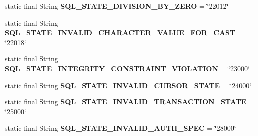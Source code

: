 \begin{DoxyCompactItemize}
\item 
\mbox{\label{classcom_1_1mysql_1_1jdbc_1_1_s_q_l_error_aa494ace8955c365c21a0f6cbff092982}} 
static final String {\bfseries S\+Q\+L\+\_\+\+S\+T\+A\+T\+E\+\_\+\+D\+I\+V\+I\+S\+I\+O\+N\+\_\+\+B\+Y\+\_\+\+Z\+E\+RO} = \char`\"{}22012\char`\"{}
\item 
\mbox{\label{classcom_1_1mysql_1_1jdbc_1_1_s_q_l_error_afa4c34094affa8f76839511bc8572d48}} 
static final String {\bfseries S\+Q\+L\+\_\+\+S\+T\+A\+T\+E\+\_\+\+I\+N\+V\+A\+L\+I\+D\+\_\+\+C\+H\+A\+R\+A\+C\+T\+E\+R\+\_\+\+V\+A\+L\+U\+E\+\_\+\+F\+O\+R\+\_\+\+C\+A\+ST} = \char`\"{}22018\char`\"{}
\item 
\mbox{\label{classcom_1_1mysql_1_1jdbc_1_1_s_q_l_error_ad5769eafd4af57a91115f3b7d6d98fbe}} 
static final String {\bfseries S\+Q\+L\+\_\+\+S\+T\+A\+T\+E\+\_\+\+I\+N\+T\+E\+G\+R\+I\+T\+Y\+\_\+\+C\+O\+N\+S\+T\+R\+A\+I\+N\+T\+\_\+\+V\+I\+O\+L\+A\+T\+I\+ON} = \char`\"{}23000\char`\"{}
\item 
\mbox{\label{classcom_1_1mysql_1_1jdbc_1_1_s_q_l_error_a94ab5e8ebca27c176a83d12876965fe8}} 
static final String {\bfseries S\+Q\+L\+\_\+\+S\+T\+A\+T\+E\+\_\+\+I\+N\+V\+A\+L\+I\+D\+\_\+\+C\+U\+R\+S\+O\+R\+\_\+\+S\+T\+A\+TE} = \char`\"{}24000\char`\"{}
\item 
\mbox{\label{classcom_1_1mysql_1_1jdbc_1_1_s_q_l_error_a172c17de0cb3218beb42b90e33467ccd}} 
static final String {\bfseries S\+Q\+L\+\_\+\+S\+T\+A\+T\+E\+\_\+\+I\+N\+V\+A\+L\+I\+D\+\_\+\+T\+R\+A\+N\+S\+A\+C\+T\+I\+O\+N\+\_\+\+S\+T\+A\+TE} = \char`\"{}25000\char`\"{}
\item 
\mbox{\label{classcom_1_1mysql_1_1jdbc_1_1_s_q_l_error_af696e36e38afbf3cd5ee3ff47306bd4f}} 
static final String {\bfseries S\+Q\+L\+\_\+\+S\+T\+A\+T\+E\+\_\+\+I\+N\+V\+A\+L\+I\+D\+\_\+\+A\+U\+T\+H\+\_\+\+S\+P\+EC} = \char`\"{}28000\char`\"{}
\item 
\mbox{\label{classcom_1_1mysql_1_1jdbc_1_1_s_q_l_error_a8d250143bc221897efb2e8256918ce6f}} 

\end{DoxyCompactItemize}
